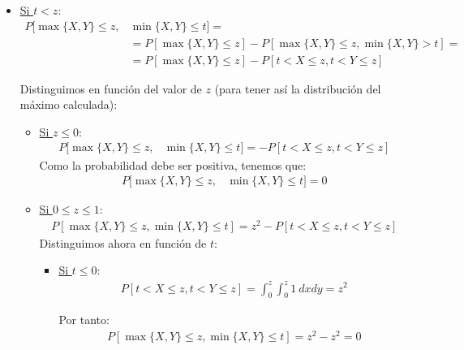 \documentclass[12pt]{article}
\begin{document}
\begin{ejercicio}
\begin{enumerate}
\begin{itemize}
                \item \ul{Si $t<z$}:
                \begin{align*}
                    P[\max\{X,Y\}\leq z, &\min\{X,Y\}\leq t]
                    =\\&= P[\max\{X,Y\}\leq z] - P[\max\{X,Y\}\leq z,\min\{X,Y\}>t]
                    =\\&= P[\max\{X,Y\}\leq z] - P[t<X\leq z,t<Y\leq z]
                \end{align*}

                Distinguimos en función del valor de $z$ (para tener así la distribución del máximo calculada):
                \begin{itemize}
                    \item \ul{Si $z\leq 0$}:
                    \begin{align*}
                        P[\max\{X,Y\}\leq z, &\min\{X,Y\}\leq t]
                        = -P[t<X\leq z,t<Y\leq z]
                    \end{align*}
                    Como la probabilidad debe ser positiva, tenemos que:
                    \begin{align*}
                        P[\max\{X,Y\}\leq z, &\min\{X,Y\}\leq t]=0
                    \end{align*}

                    \item \ul{Si $0\leq z\leq 1$}:
                    \begin{align*}
                        P[\max\{X,Y\}\leq z, \min\{X,Y\}\leq t]
                        = z^2- P[t<X\leq z,t<Y\leq z]
                    \end{align*}
                    Distinguimos ahora en función de $t$:
                    \begin{itemize}
                        \item \ul{Si $t\leq 0$}:
                        \begin{align*}
                            P[t<X\leq z,t<Y\leq z] = \int_0^z\int_0^z 1\ dxdy = z^2
                        \end{align*}

                        Por tanto:
                        \begin{align*}
                            P[\max\{X,Y\}\leq z, \min\{X,Y\}\leq t]
                            = z^2- z^2=0
                        \end{align*}


\end{itemize}
\end{itemize}
\end{itemize}
\end{enumerate}
\end{ejercicio}
\end{document}
